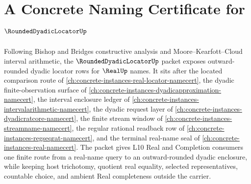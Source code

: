 \chapter{A Concrete Naming Certificate for $\RoundedDyadicLocatorUp$}
\label{ch:concrete-instances-rounded-dyadic-locator-namecert}

Following Bishop and Bridges constructive analysis and Moore--Kearfott--Cloud interval arithmetic, the $\RoundedDyadicLocatorUp$ packet exposes outward-rounded dyadic locator rows for $\RealUp$ names. It sits after the located comparison route of \autoref{ch:concrete-instances-real-locator-namecert}, the dyadic finite-observation surface of \autoref{ch:concrete-instances-dyadicapproximation-namecert}, the interval enclosure ledger of \autoref{ch:concrete-instances-intervalarithmetic-namecert}, the dyadic request layer of \autoref{ch:concrete-instances-dyadicratcore-namecert}, the finite stream window of \autoref{ch:concrete-instances-streamname-namecert}, the regular rational readback row of \autoref{ch:concrete-instances-regseqrat-namecert}, and the terminal real-name seal of \autoref{ch:concrete-instances-real-namecert}. The packet gives L10 Real and Completion consumers one finite route from a real-name query to an outward-rounded dyadic enclosure, while keeping host trichotomy, quotient real equality, selected representatives, countable choice, and ambient Real completeness outside the carrier.

